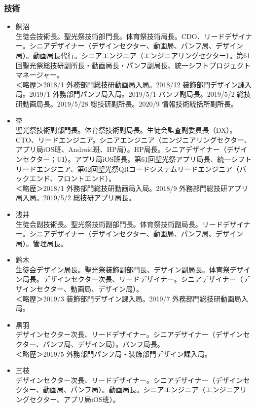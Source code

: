 \documentclass[dvipdfmx,jb5]{jarticle}
\begin{document}
\subsubsection{技術}
\begin{itemize}
  \item 飼沼\\
  生徒会技術長。聖光祭技術部門長。体育祭技術局長。CDO、リードデザイナー。シニアデザイナー（デザインセクター、動画局、パンフ局、デザイン局）。動画局長代行。シニアエンジニア（エンジニアリングセクター）。第61回聖光祭総技研副所長・動画局長・パンフ副局長、統一シフトプロジェクトマネージャー。\\
  ＜略歴＞2018/1 外務部門総技研動画局入局。2018/12 装飾部門デザイン課入局。2019/1 外務部門パンフ局入局。2019/5/1 パンフ副局長。2019/5/2 総技研動画局長。2019/5/28 総技研副所長。2020/9 情報技術統括所副所長。
  \item 李\\
  聖光祭技術副部門長。体育祭技術副局長。生徒会監査副委員長（DX）。CTO、リードエンジニア。シニアエンジニア（エンジニアリングセクター、アプリ局iOS班、Android班、HP局）。HP局長。シニアデザイナー（デザインセクター；UI）。アプリ局iOS班長。第61回聖光祭アプリ局長、統一シフトリードエンジニア、第62回聖光祭QRコードシステムリードエンジニア（バックエンド、フロントエンド）。\\
  ＜略歴＞2018/1 外務部門総技研動画局入局。2018/9 外務部門総技研アプリ局入局。2019/5/2 総技研アプリ局長。
  \item 浅井\\
  生徒会副技術長。聖光祭技術副部門長。体育祭技術副局長。リードデザイナー。シニアデザイナー（デザインセクター、動画局、パンフ局、デザイン局）。管理局長。
  \item 鈴木\\
  生徒会デザイン局長。聖光祭装飾副部門長、デザイン副局長。体育祭デザイン局長。デザインセクター次長、リードデザイナー。シニアデザイナー（デザインセクター、動画局、デザイン局）。\\
  ＜略歴＞2019/3 装飾部門デザイン課入局。2019/7 外務部門総技研動画局入局。
  \item 黒羽\\
  デザインセクター次長、リードデザイナー。シニアデザイナー（デザインセクター、パンフ局、デザイン局）。パンフ局長。\\
  ＜略歴＞2019/5 外務部門パンフ局・装飾部門デザイン課入局。
  \item 三枝\\
  デザインセクター次長、リードデザイナー。シニアデザイナー（デザインセクター、動画局、パンフ局）。動画局長。シニアエンジニア（エンジニアリングセクター、アプリ局iOS班）。\\

\end{itemize}
\end{document}
